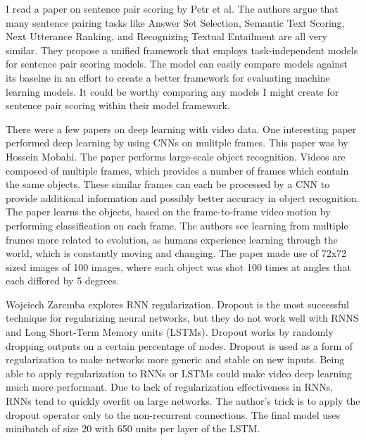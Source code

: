 I read a paper on sentence pair scoring by Petr et al.  The authors argue that many sentence pairing tasks like Answer Set Selection, Semantic Text Scoring, Next Utterance Ranking, and Recognizing Textual Entailment are all very similar.  They propose a unified framework that employs task-independent models for sentence pair scoring models.  The model can easily compare models against its baselne in an effort to create a better framework for evaluating machine learning models.  It could be worthy comparing any models I might create for sentence pair scoring within their model framework.

There were a few papers on deep learning with video data.  One interesting paper performed deep learning by using CNNs on mulitple frames.  This paper was by Hossein Mobahi.  The paper performs large-scale object recognition.  Videos are composed of multiple frames, which provides a number of frames which contain the same objects.  These similar frames can each be processed by a CNN to provide additional information and possibly better accuracy in object recognition.  The paper learns the objects, based on the frame-to-frame video motion by performing classification on each frame.  The authors see learning from multiple frames more related to evolution, as humans experience learning through the world, which is constantly moving and changing.  The paper made use of 72x72 sized images of 100 images, where each object was shot 100 times at angles that each differed by 5 degrees.

Wojciech Zaremba explores RNN regularization.  Dropout is the most successful technique for regularizing neural networks, but they do not work well with RNNS and Long Short-Term Memory units (LSTMs).  Dropout works by randomly dropping outputs on a certain percentage of nodes.  Dropout is used as a form of regularization to make networks more generic and stable on new inputs.  Being able to apply regularization to RNNs or LSTMs could make video deep learning much more performant.  Due to lack of regularization effectiveness in RNNs, RNNs tend to quickly overfit on large networks.  The author's trick is to apply the dropout operator only to the non-recurrent connections.  The final model uses minibatch of size 20 with 650 units per layer of the LSTM.

